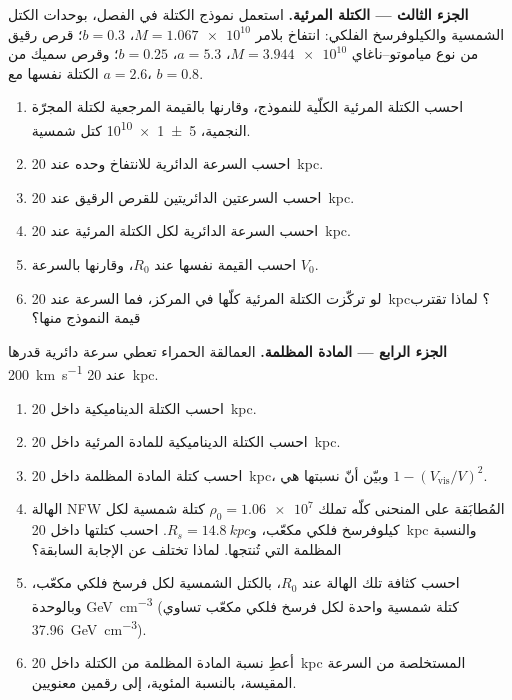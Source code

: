 \begin{problem}
\medskip\noindent\textbf{الجزء الثالث --- الكتلة المرئية.} استعمل نموذج الكتلة
في الفصل، بوحدات الكتل الشمسية والكيلوفرسخ الفلكي: انتفاخ
بلامر $M = \num{1.067e10}$، $b = 0.3$؛ قرص رقيق من نوع مياموتو--ناغاي
$M = \num{3.944e10}$، $a = 5.3$، $b = 0.25$؛ وقرص سميك من الكتلة نفسها
مع $a = 2.6$، $b = 0.8$.
\begin{enumerate}[resume]
\item احسب الكتلة المرئية الكلّية للنموذج، وقارنها بالقيمة
  المرجعية لكتلة المجرّة النجمية، \qty[separate-uncertainty=true]{5 \pm 1 e10}{} كتل
  شمسية.
\item احسب السرعة الدائرية للانتفاخ وحده عند \qty{20}{kpc}.
\item احسب السرعتين الدائريتين للقرص الرقيق  عند \qty{20}{kpc}.
\item احسب السرعة الدائرية لكل الكتلة المرئية عند
  \qty{20}{kpc}.
\item احسب القيمة نفسها عند $R_0$، وقارنها بالسرعة $V_0$.
\item لو تركّزت الكتلة المرئية كلّها في المركز، فما
  السرعة عند \qty{20}{kpc}؟ لماذا تقترب قيمة النموذج منها؟
\end{enumerate}

\medskip\noindent\textbf{الجزء الرابع --- المادة المظلمة.} العمالقة الحمراء
تعطي سرعة دائرية قدرها \qty{200}{km.s^{-1}} عند \qty{20}{kpc}.
\begin{enumerate}[resume]
\item احسب الكتلة الديناميكية داخل \qty{20}{kpc}.
\item احسب الكتلة الديناميكية للمادة المرئية داخل
  \qty{20}{kpc}.
\item احسب كتلة المادة المظلمة داخل \qty{20}{kpc}، وبيّن أنّ
  نسبتها هي $1 - (V_\mathrm{vis}/V)^2$.
\item الهالة NFW المُطابَقة على المنحنى كلّه تملك
  $\rho_0 = \num{1.06e7}$ كتلة شمسية لكل كيلوفرسخ فلكي مكعّب،
  و$R_s = \qty{14.8}{kpc}$. احسب كتلتها داخل \qty{20}{kpc}
  والنسبة المظلمة التي تُنتجها. لماذا تختلف عن الإجابة السابقة؟
\item احسب كثافة تلك الهالة عند $R_0$، بالكتل الشمسية لكل
  فرسخ فلكي مكعّب، وبالوحدة \unit{GeV.cm^{-3}} (كتلة شمسية واحدة لكل فرسخ فلكي مكعّب
  تساوي \qty{37.96}{GeV.cm^{-3}}).
\item أعطِ نسبة المادة المظلمة من الكتلة داخل \qty{20}{kpc}
  المستخلصة من السرعة المقيسة، بالنسبة المئوية، إلى رقمين
  معنويين.
\end{enumerate}
\end{problem}
